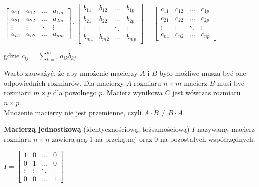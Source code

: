 \documentclass[11pt]{article}
\begin{document}
\begin{center}
\begin{math}
\begin{bmatrix}
    a_{11} & a_{12} & \dots  & a_{1m} \\
    a_{21} & a_{22} & \dots  & a_{2m} \\
    \vdots & \vdots & \ddots & \vdots \\
    a_{n1} & a_{n2} & \dots  & a_{nm}
\end{bmatrix}
\cdot
\begin{bmatrix}
    b_{11} & b_{12} & \dots  & b_{1p} \\
    b_{21} & b_{22} & \dots  & b_{2p} \\
    \vdots & \vdots & \ddots & \vdots \\
    b_{m1} & b_{m2} & \dots  & b_{mp}
\end{bmatrix}
=
\begin{bmatrix}
    c_{11} & c_{12} & \dots  & c_{1p} \\
    c_{21} & c_{22} & \dots  & c_{2p} \\
    \vdots & \vdots & \ddots & \vdots \\
    c_{n1} & c_{n2} & \dots  & c_{np}
\end{bmatrix}
\end{math}
\end{center}
\begin{center}
gdzie $c_{ij} = \sum_{k=1}^{m} a_{ik} b_{kj}$
\end{center}
Warto zauważyć, że aby mnożenie macierzy $A$ i $B$ było możliwe muszą być one odpowiednich rozmiarów. Dla macierzy $A$ rozmiaru $n \times m$ macierz $B$ musi być rozmiaru $m \times p$ dla powolnego $p$. Macierz wynikowa $C$ jest wówczas rozmiaru $n \times p$.\\
Mnożenie macierzy nie jest przemienne, czyli $A \cdot B \neq B \cdot A$.

\textbf{Macierzą jednostkową} (identycznościową, tożsamościową) $I$ nazywamy macierz rozmiaru $n \times n$ zawierającą $1$ na przekątnej oraz $0$ na pozostałych współrzędnych.

\begin{center}
\begin{math}
I = 
\begin{bmatrix}
    1 & 0 & \dots & 0 \\
    0 & 1 & \dots  & 0 \\
    \vdots & \vdots & \ddots & \vdots \\
    0 & 0 & \dots  & 1
\end{bmatrix}
\end{math}
\end{center}
\end{document}
